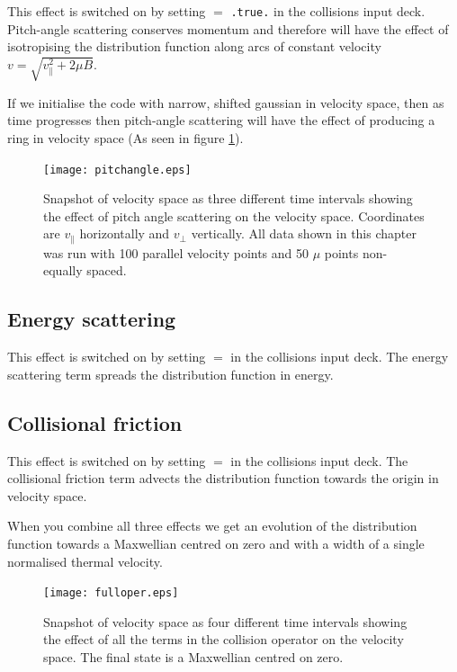 This effect is switched on by setting  $=$ \texttt{.true.} in the collisions input deck.  Pitch-angle scattering conserves momentum and therefore will have the effect of isotropising the distribution function along arcs of constant velocity $v = \sqrt{v_{\parallel}^{2} + 2\mu B}$.  

If we initialise the code with narrow, shifted gaussian in velocity space, then as time progresses then pitch-angle scattering will have the effect of producing a ring in velocity space (As seen in figure \ref{pitch-angle}).

\begin{figure}
\begin{center}
\texttt{[image: pitchangle.eps]}
\caption{Snapshot of velocity space as three different time intervals showing the effect of pitch angle scattering on the velocity space.  Coordinates are $v_{\parallel}$ horizontally and $v_{\perp}$ vertically. All data shown in this chapter was run with 100 parallel velocity points and 50 $\mu$ points non-equally spaced.\label{pitch-angle}}
\end{center}
\end{figure}

\subsection{Energy scattering}

This effect is switched on by setting  $=$  in the collisions input deck.  The energy scattering term spreads the distribution function in energy.

\subsection{Collisional friction}

This effect is switched on by setting  $=$  in the collisions input deck.  The collisional friction term advects the distribution function towards the origin in velocity space.

When you combine all three effects we get an evolution of the distribution function towards a Maxwellian centred on zero and with a width of a single normalised thermal velocity.

\begin{figure}
\begin{center}
\texttt{[image: fulloper.eps]}
\caption{Snapshot of velocity space as four different time intervals showing the effect of all the terms in the collision operator on the velocity space.  The final state is a Maxwellian centred on zero.}
\end{center}
\end{figure}

